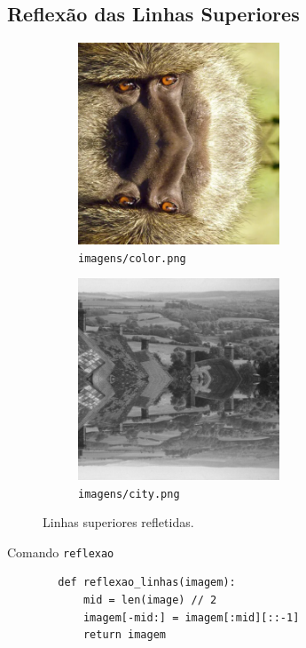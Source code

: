 \subsection{Reflexão das Linhas Superiores}

\begin{figure}[!htb]
    \centering
    \begin{subfigure}{0.45\textwidth}
        \centering
        \includegraphics[width=6cm]{resultados/colorrefl.png}
        \caption{\texttt{imagens/color.png}}
    \end{subfigure}%
    \begin{subfigure}{0.45\textwidth}
        \centering
        \includegraphics[width=6cm]{resultados/cityrefl.png}
        \caption{\texttt{imagens/city.png}}
    \end{subfigure}

    \caption{Linhas superiores refletidas.}
\end{figure}

\begin{listing}[htb]
    \caption{Comando \texttt{reflexao}}

    \begin{verbatim}
        def reflexao_linhas(imagem):
            mid = len(image) // 2
            imagem[-mid:] = imagem[:mid][::-1]
            return imagem
    \end{verbatim}
\end{listing}
